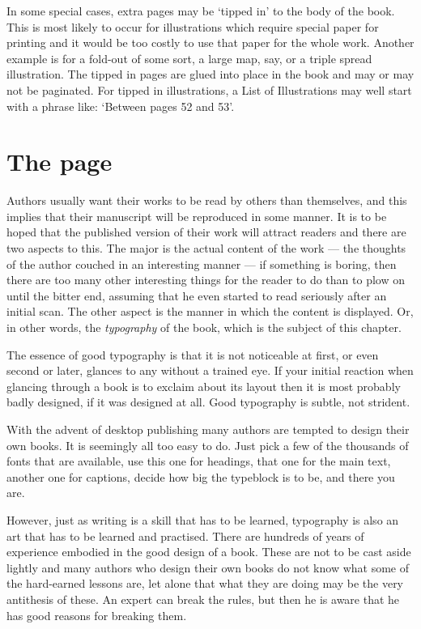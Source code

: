 \documentclass[10pt,letterpaper]{memoir}
\begin{document}
    In some special cases, extra pages may be `tipped in' to
the body of the book. This is most likely to occur for 
illustrations which
require special paper for printing and it would be too costly to use
that paper for the whole work. Another example is for a fold-out of some sort,
a large map, say, or a triple spread illustration. The tipped in pages
are glued into place in the book and may or may not be paginated. For
tipped in illustrations, a List of Illustrations may well start with
a phrase like: `Between pages 52 and 53'.


\chapter{The page}  \label{chap:lpage}

    Authors usually want their works to be read by others than themselves,
and this implies that their manuscript will be reproduced in some manner.
It is to be hoped that the published version of their work will attract 
readers and there are two aspects to this. The major is the actual content
of the work --- the thoughts of the author couched in an interesting
manner --- if something is boring, then there are too many other interesting
things for the reader to do than to plow on until the bitter end, 
assuming that he
even started to read seriously after an initial scan. The other aspect is
the manner in which the content is displayed. Or, in other words, 
the \emph{typography}
of the book, which is the subject of this chapter.

    The essence of good typography is that it is not noticeable at first,
or even second or later, glances to any without a trained eye. If your
initial reaction when glancing through a book is to exclaim about its layout
then it is most probably badly designed, if it was designed at all. Good
typography is subtle, not strident. 

    With the advent of desktop publishing
many authors are tempted to design their own books. It is seemingly all
too easy to do. Just pick a few of the thousands of fonts that are available,
use this one for headings, 
that one for the main text, another one for
captions, decide how big the typeblock is to be, and there you are.

    However, just as writing is a skill that has to be learned, typography
is also an art that has to be learned and practised. There are hundreds
of years of experience embodied in the good design of a book. These are
not to be cast aside lightly and many authors who design their own books
do not know what some of the hard-earned lessons are, let alone that what
they are doing may be the very antithesis of these. An expert can break
the rules, but then he is aware that he has good reasons for breaking them.
\end{document}
